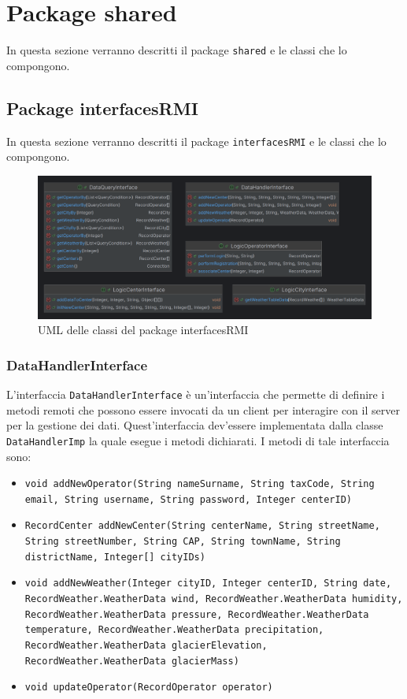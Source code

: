\section{Package shared}
In questa sezione verranno descritti il package \texttt{shared} e le classi che lo compongono.\\



\subsection{Package interfacesRMI}
In questa sezione verranno descritti il package \texttt{interfacesRMI} e le classi che lo compongono.\\

\begin{figure}[H]
    \centering
    \includegraphics[scale = 0.2]{img/interfaceRMIPackage.png}
    \caption{UML delle classi del package interfacesRMI}
    \label{fig:InterfacesRMI}
\end{figure}

\subsubsection{DataHandlerInterface}
L'interfaccia \texttt{DataHandlerInterface} è un'interfaccia che permette di definire i metodi remoti che possono
essere invocati da un client per interagire con il server per la gestione dei dati.
Quest'interfaccia dev'essere implementata dalla classe \texttt{DataHandlerImp} la quale esegue i metodi dichiarati.
I metodi di tale interfaccia sono:
\begin{itemize}
    \item \texttt{void addNewOperator(String nameSurname, String taxCode, String email, String username, String password, Integer centerID)}
    \item \texttt{RecordCenter addNewCenter(String centerName, String streetName, String streetNumber, String CAP, String townName, String districtName, Integer[] cityIDs)}
    \item \texttt{void addNewWeather(Integer cityID, Integer centerID, String date, RecordWeather.WeatherData wind, RecordWeather.WeatherData humidity, RecordWeather.WeatherData pressure, RecordWeather.WeatherData temperature, RecordWeather.WeatherData precipitation, RecordWeather.WeatherData glacierElevation, RecordWeather.WeatherData glacierMass)}
    \item \texttt{void updateOperator(RecordOperator operator)}
\end{itemize}

